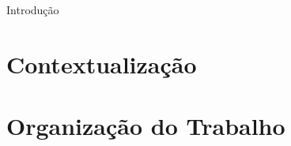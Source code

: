 \begin{chapter}{Introdução}

\section{Contextualização}

\section{Organização do Trabalho}

\end{chapter}
